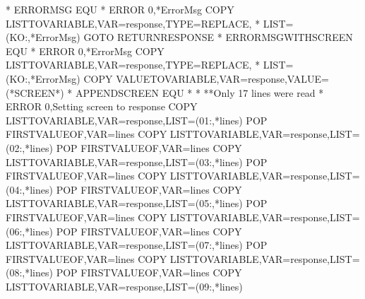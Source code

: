 \documentclass[letterpaper,10pt,english]{sphinxmanual}
\begin{document}
\begin{sphinxVerbatim}[commandchars=\\\{\}]
*
ERRORMSG EQU   *
   ERROR\PYGZdl{} 0,\PYGZsq{}*ErrorMsg\PYGZsq{}
   COPY\PYGZdl{} LIST\PYGZhy{}TO\PYGZhy{}VARIABLE,VAR=\PYGZsq{}response\PYGZsq{},TYPE=REPLACE,           *
         LIST=(\PYGZsq{}KO:\PYGZsq{},\PYGZsq{}*ErrorMsg\PYGZsq{})
   GOTO\PYGZdl{} RETURN\PYGZus{}RESPONSE
*
ERRORMSG\PYGZus{}WITH\PYGZus{}SCREEN EQU *
   ERROR\PYGZdl{} 0,\PYGZsq{}*ErrorMsg\PYGZsq{}
   COPY\PYGZdl{} LIST\PYGZhy{}TO\PYGZhy{}VARIABLE,VAR=\PYGZsq{}response\PYGZsq{},TYPE=REPLACE,           *
         LIST=(\PYGZsq{}KO:\PYGZsq{},\PYGZsq{}*ErrorMsg\PYGZsq{})
   COPY\PYGZdl{} VALUE\PYGZhy{}TO\PYGZhy{}VARIABLE,VAR=\PYGZsq{}response\PYGZsq{},VALUE=\PYGZsq{}(*SCREEN*)\PYGZsq{}
*
APPEND\PYGZus{}SCREEN  EQU *
*
**Only 17 lines were read
*
   ERROR\PYGZdl{} 0,\PYGZsq{}Setting screen to response\PYGZsq{}
   COPY\PYGZdl{} LIST\PYGZhy{}TO\PYGZhy{}VARIABLE,VAR=\PYGZsq{}response\PYGZsq{},LIST=(\PYGZsq{}01:\PYGZsq{},\PYGZsq{}*lines\PYGZsq{})
   POP\PYGZdl{} FIRST\PYGZhy{}VALUE\PYGZhy{}OF,VAR=\PYGZsq{}lines\PYGZsq{}
   COPY\PYGZdl{} LIST\PYGZhy{}TO\PYGZhy{}VARIABLE,VAR=\PYGZsq{}response\PYGZsq{},LIST=(\PYGZsq{}02:\PYGZsq{},\PYGZsq{}*lines\PYGZsq{})
   POP\PYGZdl{} FIRST\PYGZhy{}VALUE\PYGZhy{}OF,VAR=\PYGZsq{}lines\PYGZsq{}
   COPY\PYGZdl{} LIST\PYGZhy{}TO\PYGZhy{}VARIABLE,VAR=\PYGZsq{}response\PYGZsq{},LIST=(\PYGZsq{}03:\PYGZsq{},\PYGZsq{}*lines\PYGZsq{})
   POP\PYGZdl{} FIRST\PYGZhy{}VALUE\PYGZhy{}OF,VAR=\PYGZsq{}lines\PYGZsq{}
   COPY\PYGZdl{} LIST\PYGZhy{}TO\PYGZhy{}VARIABLE,VAR=\PYGZsq{}response\PYGZsq{},LIST=(\PYGZsq{}04:\PYGZsq{},\PYGZsq{}*lines\PYGZsq{})
   POP\PYGZdl{} FIRST\PYGZhy{}VALUE\PYGZhy{}OF,VAR=\PYGZsq{}lines\PYGZsq{}
   COPY\PYGZdl{} LIST\PYGZhy{}TO\PYGZhy{}VARIABLE,VAR=\PYGZsq{}response\PYGZsq{},LIST=(\PYGZsq{}05:\PYGZsq{},\PYGZsq{}*lines\PYGZsq{})
   POP\PYGZdl{} FIRST\PYGZhy{}VALUE\PYGZhy{}OF,VAR=\PYGZsq{}lines\PYGZsq{}
   COPY\PYGZdl{} LIST\PYGZhy{}TO\PYGZhy{}VARIABLE,VAR=\PYGZsq{}response\PYGZsq{},LIST=(\PYGZsq{}06:\PYGZsq{},\PYGZsq{}*lines\PYGZsq{})
   POP\PYGZdl{} FIRST\PYGZhy{}VALUE\PYGZhy{}OF,VAR=\PYGZsq{}lines\PYGZsq{}
   COPY\PYGZdl{} LIST\PYGZhy{}TO\PYGZhy{}VARIABLE,VAR=\PYGZsq{}response\PYGZsq{},LIST=(\PYGZsq{}07:\PYGZsq{},\PYGZsq{}*lines\PYGZsq{})
   POP\PYGZdl{} FIRST\PYGZhy{}VALUE\PYGZhy{}OF,VAR=\PYGZsq{}lines\PYGZsq{}
   COPY\PYGZdl{} LIST\PYGZhy{}TO\PYGZhy{}VARIABLE,VAR=\PYGZsq{}response\PYGZsq{},LIST=(\PYGZsq{}08:\PYGZsq{},\PYGZsq{}*lines\PYGZsq{})
   POP\PYGZdl{} FIRST\PYGZhy{}VALUE\PYGZhy{}OF,VAR=\PYGZsq{}lines\PYGZsq{}
   COPY\PYGZdl{} LIST\PYGZhy{}TO\PYGZhy{}VARIABLE,VAR=\PYGZsq{}response\PYGZsq{},LIST=(\PYGZsq{}09:\PYGZsq{},\PYGZsq{}*lines\PYGZsq{})

\end{sphinxVerbatim}
\end{document}
